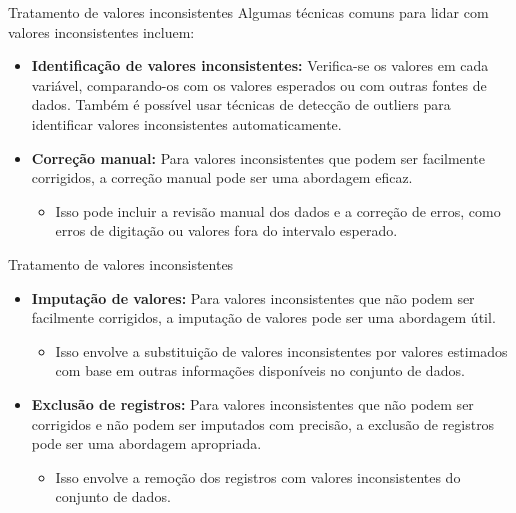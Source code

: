 \documentclass[
  ignorenonframetext,
  aspectratio=169,
]{beamer}
\providecommand{\tightlist}{%
  \setlength{\itemsep}{0pt}\setlength{\parskip}{0pt}}
\begin{document}
\begin{frame}{Tratamento de valores inconsistentes}
\label{tratamento-de-valores-inconsistentes-1}
Algumas técnicas comuns para lidar com valores inconsistentes incluem:

\begin{itemize}
\tightlist
\item
  \textbf{Identificação de valores inconsistentes:} Verifica-se os
  valores em cada variável, comparando-os com os valores esperados ou
  com outras fontes de dados. Também é possível usar técnicas de
  detecção de outliers para identificar valores inconsistentes
  automaticamente.
\end{itemize}

\pause

\begin{itemize}
\item
  \textbf{Correção manual:} Para valores inconsistentes que podem ser
  facilmente corrigidos, a correção manual pode ser uma abordagem
  eficaz.

  \begin{itemize}
  \tightlist
  \item
    Isso pode incluir a revisão manual dos dados e a correção de erros,
    como erros de digitação ou valores fora do intervalo esperado.
  \end{itemize}
\end{itemize}
\end{frame}

\begin{frame}{Tratamento de valores inconsistentes}
\label{tratamento-de-valores-inconsistentes-2}
\begin{itemize}
\item
  \textbf{Imputação de valores:} Para valores inconsistentes que não
  podem ser facilmente corrigidos, a imputação de valores pode ser uma
  abordagem útil.

  \begin{itemize}
  \tightlist
  \item
    Isso envolve a substituição de valores inconsistentes por valores
    estimados com base em outras informações disponíveis no conjunto de
    dados.
  \end{itemize}
\end{itemize}

\pause

\begin{itemize}
\item
  \textbf{Exclusão de registros:} Para valores inconsistentes que não
  podem ser corrigidos e não podem ser imputados com precisão, a
  exclusão de registros pode ser uma abordagem apropriada.

  \begin{itemize}
  \tightlist
  \item
    Isso envolve a remoção dos registros com valores inconsistentes do
    conjunto de dados.
  \end{itemize}
\end{itemize}
\end{frame}
\end{document}
